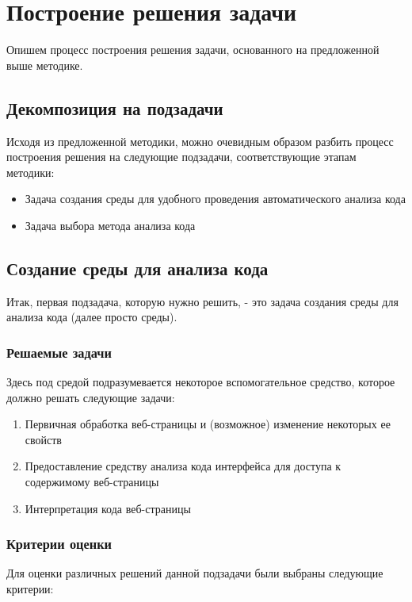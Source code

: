 
\chapter{Построение решения задачи}\label{Solution}
Опишем процесс построения решения задачи, основанного на предложенной выше методике.

\section{Декомпозиция на подзадачи}
Исходя из предложенной методики, можно очевидным образом разбить процесс построения решения на следующие подзадачи, соответствующие этапам методики:

\begin{itemize}
	\item Задача создания среды для удобного проведения автоматического анализа кода
	\item Задача выбора метода анализа кода
\end{itemize}

\section{Создание среды для анализа кода}

Итак, первая подзадача, которую нужно решить, - это задача создания среды для анализа кода (далее просто среды).

\subsection{Решаемые задачи}
	Здесь под средой подразумевается некоторое вспомогательное средство, которое должно решать следующие задачи:

	\begin{enumerate}
		\item Первичная обработка веб-страницы и (возможное) изменение некоторых ее свойств
		\item Предоставление средству анализа кода интерфейса для доступа к содержимому веб-страницы
		\item Интерпретация кода веб-страницы
	\end{enumerate}

\subsection{Критерии оценки}
	Для оценки различных решений данной подзадачи были выбраны следующие критерии:

